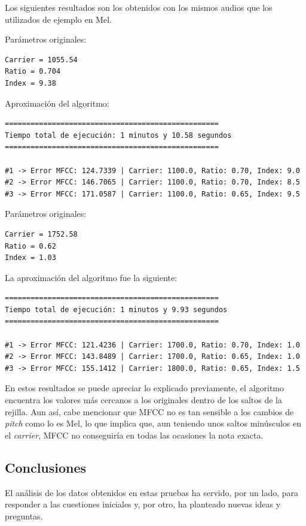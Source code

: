 Los siguientes resultados son los obtenidos con los mismos audios que los utilizados de ejemplo en Mel.

Parámetros originales:
\begin{verbatim}
Carrier = 1055.54
Ratio = 0.704
Index = 9.38
\end{verbatim}

Aproximación del algoritmo:

\begin{verbatim}
==================================================
Tiempo total de ejecución: 1 minutos y 10.58 segundos
==================================================

#1 -> Error MFCC: 124.7339 | Carrier: 1100.0, Ratio: 0.70, Index: 9.0
#2 -> Error MFCC: 146.7065 | Carrier: 1100.0, Ratio: 0.70, Index: 8.5
#3 -> Error MFCC: 171.0587 | Carrier: 1100.0, Ratio: 0.65, Index: 9.5
\end{verbatim}

Parámetros originales:
\begin{verbatim}
Carrier = 1752.58
Ratio = 0.62
Index = 1.03
\end{verbatim}

La aproximación del algoritmo fue la siguiente:

\begin{verbatim}
==================================================
Tiempo total de ejecución: 1 minutos y 9.93 segundos
==================================================

#1 -> Error MFCC: 121.4236 | Carrier: 1700.0, Ratio: 0.70, Index: 1.0
#2 -> Error MFCC: 143.8489 | Carrier: 1700.0, Ratio: 0.65, Index: 1.0
#3 -> Error MFCC: 155.1412 | Carrier: 1800.0, Ratio: 0.65, Index: 1.5
\end{verbatim}


En estos resultados se puede apreciar lo explicado previamente, el algoritmo encuentra los valores
más cercanos a los originales dentro de los saltos de la rejilla. Aun así, cabe mencionar que 
MFCC no es tan sensible a los cambios de \textit{pitch} como lo es Mel, lo que implica que, aun teniendo
unos saltos minúsculos en el \textit{carrier}, MFCC no conseguiría en todas las ocasiones la nota exacta.


\subsection{Conclusiones}
El análisis de los datos obtenidos en estas pruebas ha servido, por un lado, para responder a las cuestiones
iniciales y, por otro, ha planteado nuevas ideas y preguntas.

